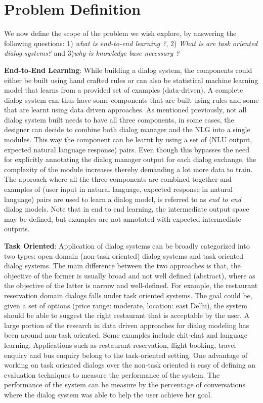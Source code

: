\section{Problem Definition}
We now define the scope of the problem we wish explore, by answering the following questions: 1) \textit{what is end-to-end learning ?}, 2) \textit{What is are task oriented dialog systems?} and 3)\textit{why is knowledge base necessary ?}

\textbf{End-to-End Learning}:  While building a dialog system, the components could either be built using hand crafted rules or can also be statistical machine learning model that learns from a provided set of examples (data-driven). A complete dialog system can thus have some components that are built using rules and some that are learnt using data driven approaches. As mentioned previously, not all dialog system built needs to have all three components, in some cases, the designer can decide to combine both dialog manager and the NLG into a single modules. This way the component can be learnt by using a set of (NLU output, expected natural language response) pairs. Even though this bypasses the need for explicitly annotating the dialog manager output for each dialog exchange, the complexity of the module increases thereby demanding a lot more data to train. The approach where all the three components are combined together and examples of (user input in natural language, expected response in natural language) pairs are used to learn a dialog model, is referred to as \textit{end to end} dialog models. Note that in end to end learning, the intermediate output space may be  defined, but examples are not annotated with expected intermediate outputs.

\textbf{Task Oriented}: Application of dialog systems can be broadly categorized into two types: open domain (non-task oriented) dialog systems and task oriented dialog systems. The main difference between the two approaches is that, the objective of the former is usually broad and not well defined (abstract), where as the objective of the latter is  narrow and well-defined. For example, the restaurant reservation domain dialogs falls under task oriented systems. The goal could be, given a set of options (price range: moderate, location: east Delhi), the system should be able to suggest the right restaurant that is acceptable by the user. A large portion of the research in data driven approaches for dialog modeling has been around non-task oriented. Some examples include chit-chat and language learning. Applications such as restaurant reservation, flight booking, travel enquiry and bus enquiry belong to the task-oriented setting.  One advantage of working on task oriented dialogs over the non-task oriented is easy of defining an evaluation techniques to measure the performance of the system. The performance of the system can be measure by the percentage of conversations where the dialog system was able to help the user achieve her goal. 


